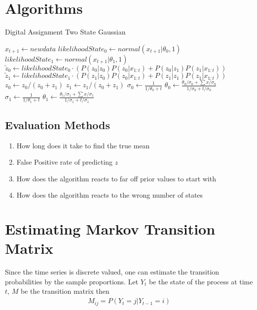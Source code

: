 \documentclass{article}
\begin{document}
\section{Algorithms}
\begin{algorithm}
    \caption{Digital Assignment Two State Gaussian}
    \begin{algorithmic}
        \State $x_{t+1} \gets new data $
        \State $likelihood State_0 \gets normal(x_{t+1} | \theta_0, 1)$
        \State $likelihood State_1 \gets normal(x_{t+1} | \theta_1, 1)$
        \State $\tilde{z}_0 \gets likelihood State_0 \cdot (P(z_0|z_0)P(z_0|x_{1:t}) + P(z_0|z_1)P(z_1|x_{1:t}))$ 
        \State $\tilde{z}_1 \gets likelihood State_1 \cdot (P(z_1|z_0)P(z_0|x_{1:t}) + P(z_1|z_1)P(z_1|x_{1:t}))$ 
        \State $z_0 \gets z_0/(z_0+z_1)$
        \State $z_1 \gets z_1/(z_0+z_1)$
        \State $\sigma_0 \gets \frac{1}{1/\theta_0 + t}$
        \State $\theta_0 \gets \frac{\theta_0/\sigma_0 + \sum x / \sigma_0}{1/\sigma_0 + t/\sigma_0}$
        \Else
        \State $\sigma_1 \gets \frac{1}{1/\theta_1 + t}$
        \State $\theta_1 \gets \frac{\theta_1/\sigma_1 + \sum x / \sigma_1}{1/\sigma_1 + t/\sigma_1}$
        \EndIf
        \State
        \EndWhile
        \EndProcedure
    \end{algorithmic}
\end{algorithm}

    \subsection{Evaluation Methods}
    \begin{enumerate}
        \item How long does it take to find the true mean
        \item False Positive rate of predicting $z$
        \item How does the algorithm reacts to far off prior values to start with
        \item How does the algorithm reacts to the wrong number of states
    \end{enumerate}
    
\section{Estimating Markov Transition Matrix}

Since the time series is discrete valued, one can estimate the transition probabilities by the sample proportions. Let $Y_t$ be the state of the process at time $t$, $M$ be the transition matrix then
\begin{align}
    M_{ij}=P(Y_t=j|Y_{t-1}=i)
\end{align}
\end{document}
